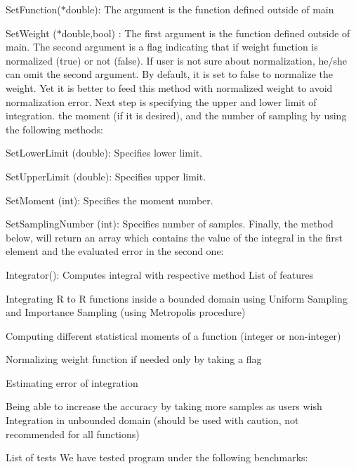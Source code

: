 \begin{DoxyEnumerate}
\item Set\+Function($\ast$double)\+: The argument is the function defined outside of main
\item Set\+Weight ($\ast$double,bool) \+: The first argument is the function defined outside of main. The second argument is a flag indicating that if weight function is normalized (true) or not (false). If user is not sure about normalization, he/she can omit the second argument. By default, it is set to false to normalize the weight. Yet it is better to feed this method with normalized weight to avoid normalization error. Next step is specifying the upper and lower limit of integration. the moment (if it is desired), and the number of sampling by using the following methods\+:
\end{DoxyEnumerate}
\begin{DoxyEnumerate}
\item Set\+Lower\+Limit (double)\+: Specifies lower limit.
\item Set\+Upper\+Limit (double)\+: Specifies upper limit.
\item Set\+Moment (int)\+: Specifies the moment number.
\item Set\+Sampling\+Number (int)\+: Specifies number of samples. Finally, the method below, will return an array which contains the value of the integral in the first element and the evaluated error in the second one\+:
\end{DoxyEnumerate}
\begin{DoxyEnumerate}
\item Integrator()\+: Computes integral with respective method List of features
\end{DoxyEnumerate}
\begin{DoxyEnumerate}
\item Integrating R to R functions inside a bounded domain using Uniform Sampling and Importance Sampling (using Metropolis procedure)
\item Computing different statistical moments of a function (integer or non-\/integer)
\item Normalizing weight function if needed only by taking a flag
\item Estimating error of integration
\item Being able to increase the accuracy by taking more samples as user\textquotesingle{}s wish Integration in unbounded domain (should be used with caution, not recommended for all functions)
\item List of tests We have tested program under the following benchmarks\+:
\end{DoxyEnumerate}
